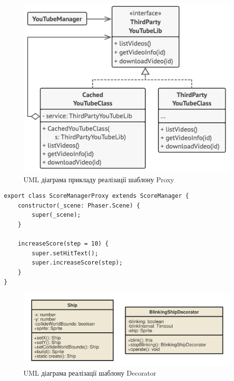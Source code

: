 \documentclass[oneside,14pt]{extarticle}
\begin{document}
\begin{normalsize}
	\begin{figure}[H]
		\centering
		\includegraphics[]{proxy-ex}
		\caption{UML діаграма прикладу реалізації шаблону Proxy}
	\end{figure}
	
	\begin{small}
		\begin{lstlisting}
export class ScoreManagerProxy extends ScoreManager {
	constructor(_scene: Phaser.Scene) {
		super(_scene);
	}
	
	increaseScore(step = 10) {
		super.setHitText();
		super.increaseScore(step);
	}
}
		\end{lstlisting}
	\end{small}
	
	\begin{figure}[H]
		\centering
		\includegraphics[width=\textwidth]{decorator}
		\caption{UML діаграма реалізації шаблону Decorator}
	\end{figure}
	

\end{normalsize}
\end{document}
